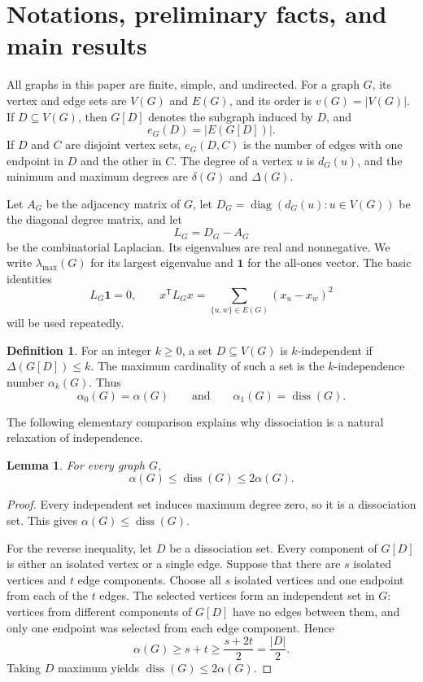 \documentclass[11pt]{article}
\newtheorem{lemma}[theorem]{Lemma}
\theoremstyle{definition}
\newtheorem{definition}[theorem]{Definition}
\DeclareMathOperator{\diss}{diss}
\newcommand{\ind}{\mathbf{1}}
\begin{document}
\section{Notations, preliminary facts, and main results}\label{sec:notation}

All graphs in this paper are finite, simple, and undirected.  For a graph
$G$, its vertex and edge sets are $V(G)$ and $E(G)$, and its order is
$v(G)=|V(G)|$.  If $D\subseteq V(G)$, then $G[D]$ denotes the subgraph
induced by $D$, and
\[
  e_G(D)=|E(G[D])|.
\]
If $D$ and $C$ are disjoint vertex sets, $e_G(D,C)$ is the number of edges
with one endpoint in $D$ and the other in $C$.  The degree of a vertex $u$
is $d_G(u)$, and the minimum and maximum degrees are $\delta(G)$ and
$\Delta(G)$.

Let $A_G$ be the adjacency matrix of $G$, let
$D_G=\operatorname{diag}(d_G(u):u\in V(G))$ be the diagonal degree matrix,
and let
\[
  L_G=D_G-A_G
\]
be the combinatorial Laplacian.  Its eigenvalues are real and nonnegative.
We write $\lambda_{\max}(G)$ for its largest eigenvalue and $\ind$ for the
all-ones vector.  The basic identities
\begin{equation}\label{eq:laplacian-basic}
  L_G\ind=0,
  \qquad
  x^{\mathsf T}L_Gx
  =\sum_{\{u,w\}\in E(G)}(x_u-x_w)^2
\end{equation}
will be used repeatedly.

\begin{definition}
For an integer $k\ge0$, a set $D\subseteq V(G)$ is $k$-independent if
$\Delta(G[D])\le k$.  The maximum cardinality of such a set is the
$k$-independence number $\alpha_k(G)$.  Thus
\[
  \alpha_0(G)=\alpha(G)
  \qquad\text{and}\qquad
  \alpha_1(G)=\diss(G).
\]
\end{definition}

The following elementary comparison explains why dissociation is a natural
relaxation of independence.

\begin{lemma}\label{lem:alpha-diss}
For every graph $G$,
\[
  \alpha(G)\le\diss(G)\le2\alpha(G).
\]
\end{lemma}

\begin{proof}
Every independent set induces maximum degree zero, so it is a dissociation
set.  This gives $\alpha(G)\le\diss(G)$.

For the reverse inequality, let $D$ be a dissociation set.  Every component
of $G[D]$ is either an isolated vertex or a single edge.  Suppose that there
are $s$ isolated vertices and $t$ edge components.  Choose all $s$ isolated
vertices and one endpoint from each of the $t$ edges.  The selected vertices
form an independent set in $G$: vertices from different components of
$G[D]$ have no edges between them, and only one endpoint was selected from
each edge component.  Hence
\[
  \alpha(G)\ge s+t\ge\frac{s+2t}{2}=\frac{|D|}{2}.
\]
Taking $D$ maximum yields $\diss(G)\le2\alpha(G)$.
\end{proof}
\end{document}
